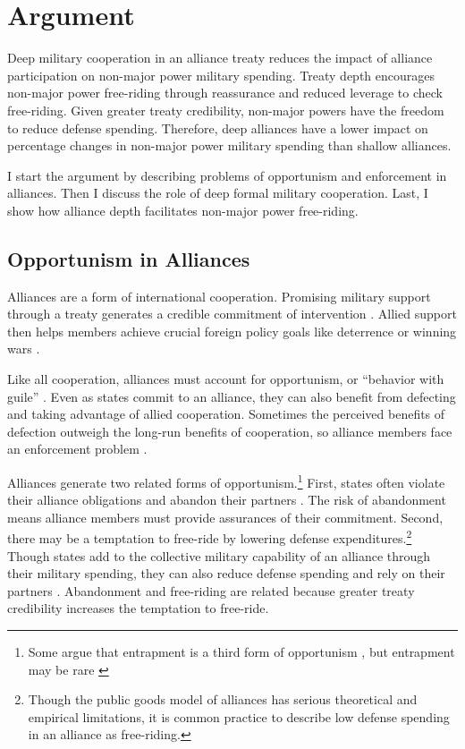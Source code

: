 \documentclass[12pt]{article}
\begin{document}
\section*{Argument}

Deep military cooperation in an alliance treaty reduces the impact of alliance participation on non-major power military spending.
Treaty depth encourages non-major power free-riding through reassurance and reduced leverage to check free-riding.  
Given greater treaty credibility, non-major powers have the freedom to reduce defense spending.
Therefore, deep alliances have a lower impact on percentage changes in non-major power military spending than shallow alliances. 


I start the argument by describing problems of opportunism and enforcement in alliances. 
Then I discuss the role of deep formal military cooperation. 
Last, I show how alliance depth facilitates non-major power free-riding. 


\subsection*{Opportunism in Alliances}

Alliances are a form of international cooperation. 
Promising military support through a treaty generates a credible commitment of intervention \citep{Fearon1997, Morrow2000}. 
Allied support then helps members achieve crucial foreign policy goals like deterrence or winning wars \citep{Walt1990, Snyder1997}. 


Like all cooperation, alliances must account for opportunism, or ``behavior with guile'' \citep{Williamson1985}. 
Even as states commit to an alliance, they can also benefit from defecting and taking advantage of allied cooperation. 
Sometimes the perceived benefits of defection outweigh the long-run benefits of cooperation, so alliance members face an enforcement problem \citep{Fearon1998a, Koremenosetal2001}.


Alliances generate two related forms of opportunism.\footnote{Some argue that entrapment is a third form of opportunism \citep{Snyder1984}, but entrapment may be rare \citep{Kim2011, Beckley2015}}
First, states often violate their alliance obligations and abandon their partners \citep{BerkemeierFuhrmann2018}.
The risk of abandonment means alliance members must provide assurances of their commitment. 
Second, there may be a temptation to free-ride by lowering defense expenditures.\footnote{Though the public goods model of alliances has serious theoretical and empirical limitations, it is common practice to describe low defense spending in an alliance as free-riding.}
Though states add to the collective military capability of an alliance through their military spending, they can also reduce defense spending and rely on their partners \citep{OlsonZeckhauser1966, Morrow1993, Conybeare1994, SandlerHartley2001}.
Abandonment and free-riding are related because greater treaty credibility increases the temptation to free-ride. 
\end{document}
